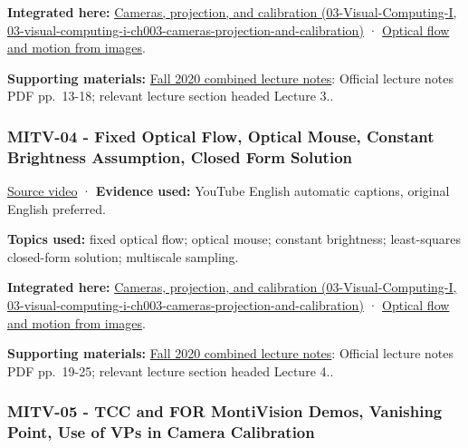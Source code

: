 \textbf{Integrated here:} \href{../03-Visual-Computing-I/main.pdf\#nameddest=03-visual-computing-i-ch003-cameras-projection-and-calibration}{Cameras, projection, and calibration (03-Visual-Computing-I, 03-visual-computing-i-ch003-cameras-projection-and-calibration)} · \hyperref[04-visual-computing-ii-ch030-optical-flow-and-motion-from-images]{Optical flow and motion from images}.

\textbf{Supporting materials:} \href{https://ocw.mit.edu/courses/6-801-machine-vision-fall-2020/9ec44f69e72995c370b3797818ba01e6_MIT6_801F20_lectureNotes.pdf}{Fall 2020 combined lecture notes}: Official lecture notes PDF pp.~13-18; relevant lecture section headed Lecture 3..

\subsubsection{MITV-04 - Fixed Optical Flow, Optical Mouse, Constant Brightness Assumption, Closed Form Solution}\label{04-visual-computing-ii-ch036-mitv-04---fixed-optical-flow-optical-mouse-constant-brightness-assumption-closed-form-solution}

\href{https://www.youtube.com/watch?v=3NarS3QpaU0}{Source video} · \textbf{Evidence used:} YouTube English automatic captions, original English preferred.

\textbf{Topics used:} fixed optical flow; optical mouse; constant brightness; least-squares closed-form solution; multiscale sampling.

\textbf{Integrated here:} \href{../03-Visual-Computing-I/main.pdf\#nameddest=03-visual-computing-i-ch003-cameras-projection-and-calibration}{Cameras, projection, and calibration (03-Visual-Computing-I, 03-visual-computing-i-ch003-cameras-projection-and-calibration)} · \hyperref[04-visual-computing-ii-ch030-optical-flow-and-motion-from-images]{Optical flow and motion from images}.

\textbf{Supporting materials:} \href{https://ocw.mit.edu/courses/6-801-machine-vision-fall-2020/9ec44f69e72995c370b3797818ba01e6_MIT6_801F20_lectureNotes.pdf}{Fall 2020 combined lecture notes}: Official lecture notes PDF pp.~19-25; relevant lecture section headed Lecture 4..

\subsubsection{MITV-05 - TCC and FOR MontiVision Demos, Vanishing Point, Use of VPs in Camera Calibration}\label{04-visual-computing-ii-ch036-mitv-05---tcc-and-for-montivision-demos-vanishing-point-use-of-vps-in-camera-calibration}


